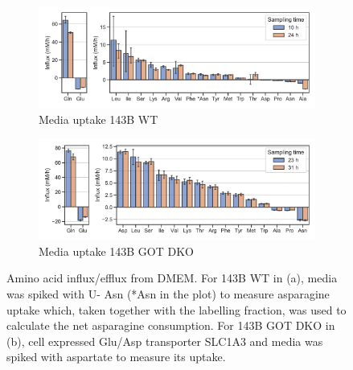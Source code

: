 \begin{figure}
     \centering
     \begin{subfigure}[b]{0.75\textwidth}
         \centering
         \includegraphics[width=\textwidth]{figures/chap2/flux_143wt.pdf}
         \caption{Media uptake 143B WT}
         \label{fig:ch2:flux_143wt}
     \end{subfigure}
     \begin{subfigure}[b]{0.75\textwidth}
         \centering
         \includegraphics[width=\textwidth]{figures/chap2/flux_143dko.pdf}
         \caption{Media uptake 143B GOT DKO}
         \label{fig:ch2:flux_143dko}
     \end{subfigure}
        \caption[Media amino acid uptake]{
        Amino acid influx/efflux from DMEM.
        For 143B WT in (a), media was spiked with U-\hCi{} Asn (*Asn in the plot) to measure asparagine uptake which, taken together with the labelling fraction, was used to calculate the net asparagine consumption.
        For 143B GOT DKO in (b), cell expressed Glu/Asp transporter SLC1A3 and media was spiked with aspartate to measure its uptake.
        }
\end{figure}



